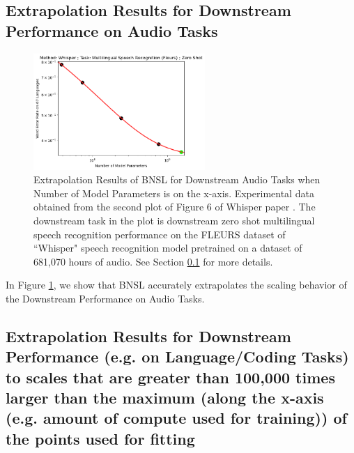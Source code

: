 \documentclass{article} %
\begin{document}
\subsection{Extrapolation Results for Downstream Performance on Audio Tasks}
\label{section:extrapolate_audio}

\begin{figure}[htbp]
    \centering
\includegraphics[width=0.58\textwidth]{figures/audio/whisper__parameter_scaling.png}

    \caption{
Extrapolation Results of BNSL for Downstream Audio Tasks when Number of Model Parameters is on the x-axis. Experimental data obtained from the second plot of Figure 6 of Whisper paper \citep{radford2022robust}. The downstream task in the plot is downstream zero shot multilingual speech recognition performance on the FLEURS dataset of ``Whisper" speech recognition model pretrained on a dataset of 681,070 hours of audio. See Section \ref{section:extrapolate_audio} for more details.
    }
    \label{fig:extrapolate_audio}
\end{figure}

In Figure \ref{fig:extrapolate_audio}, we show that BNSL accurately extrapolates the scaling behavior of the Downstream Performance on Audio Tasks.

\clearpage

\subsection{Extrapolation Results for Downstream Performance (e.g. on Language/Coding Tasks) to scales that are \textbf{greater than 100,000 times larger} than the maximum (along the x-axis (e.g. amount of compute used for training)) of the points used for fitting}
\label{section:extrapolate_gpt4}
\end{document}
